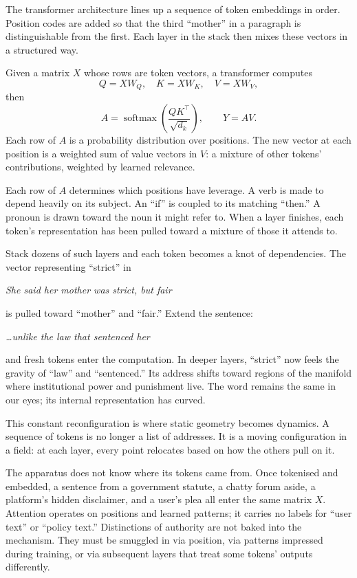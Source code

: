 \documentclass[12pt,a4paper]{article}
\begin{document}
The transformer architecture lines up a sequence of token embeddings in order. Position codes are added so that the third ``mother'' in a paragraph is distinguishable from the first. Each layer in the stack then mixes these vectors in a structured way.

\begin{formalbox}[title={Self-Attention as Contextual Mixing}]
Given a matrix $X$ whose rows are token vectors, a transformer computes
\[
Q = XW_Q,\quad K = XW_K,\quad V = XW_V,
\]
then
\[
A = \operatorname{softmax}\!\left(\frac{QK^\top}{\sqrt{d_k}}\right),\qquad Y = AV.
\]
Each row of $A$ is a probability distribution over positions. The new vector at each position is a weighted sum of value vectors in $V$: a mixture of other tokens' contributions, weighted by learned relevance.
\end{formalbox}

Each row of $A$ determines which positions have leverage. A verb is made to depend heavily on its subject. An ``if'' is coupled to its matching ``then.'' A pronoun is drawn toward the noun it might refer to. When a layer finishes, each token's representation has been pulled toward a mixture of those it attends to.

Stack dozens of such layers and each token becomes a knot of dependencies. The vector representing ``strict'' in

\medskip
\noindent\emph{She said her mother was strict, but fair}
\medskip

\noindent is pulled toward ``mother'' and ``fair.'' Extend the sentence:

\medskip
\noindent\emph{\ldots unlike the law that sentenced her}
\medskip

\noindent and fresh tokens enter the computation. In deeper layers, ``strict'' now feels the gravity of ``law'' and ``sentenced.'' Its address shifts toward regions of the manifold where institutional power and punishment live. The word remains the same in our eyes; its internal representation has curved.

This constant reconfiguration is where static geometry becomes dynamics. A sequence of tokens is no longer a list of addresses. It is a moving configuration in a field: at each layer, every point relocates based on how the others pull on it.

The apparatus does not know where its tokens came from. Once tokenised and embedded, a sentence from a government statute, a chatty forum aside, a platform's hidden disclaimer, and a user's plea all enter the same matrix $X$. Attention operates on positions and learned patterns; it carries no labels for ``user text'' or ``policy text.'' Distinctions of authority are not baked into the mechanism. They must be smuggled in via position, via patterns impressed during training, or via subsequent layers that treat some tokens' outputs differently.
\end{document}
